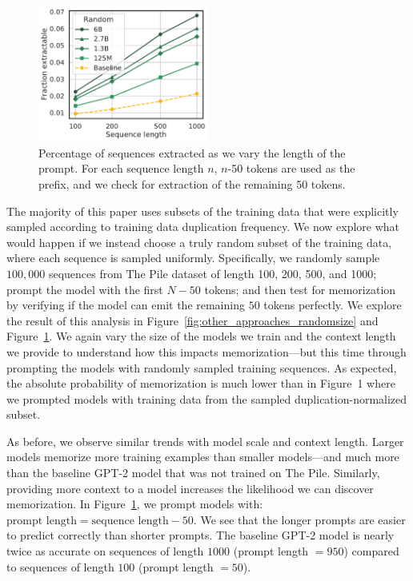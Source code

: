 \begin{figure}[h]
    \centering
    \includegraphics[width=0.5\textwidth]{figures/random_exactly_mem-vs-prompt_len-seq-varyseqlen-gen-50-xlabel-ylabel-markers} %
    \caption{Percentage of sequences extracted as we vary the length of the prompt. For each sequence length $n$, $n$-50 tokens are used as the prefix, and we check for extraction of the remaining 50 tokens.}
    \label{fig:other_approaches_randomlength}
\end{figure}


The majority of this paper uses subsets of the training data that were explicitly sampled according to training data duplication frequency.
%
We now explore what would happen if we instead choose a
truly random subset of the training data, where each sequence is sampled uniformly.
%
Specifically, we randomly sample $100,000$ sequences
from The Pile dataset of length 100, 200, 500, and 1000;
prompt the model with the first $N-50$ tokens; and then
test for memorization by verifying if the model can emit the remaining $50$ tokens perfectly.    
%
We explore the result of this analysis in
Figure~\ref{fig:other_approaches_randomsize} and Figure~\ref{fig:other_approaches_randomlength}.
We again vary the size of the models we train and the
context length we provide to understand how this impacts memorization---but this time through prompting the models
with randomly sampled training sequences.
%
As expected, the absolute probability of memorization is much lower than in Figure~1 where we prompted models with training data from the sampled duplication-normalized subset.

As before, we observe similar trends with model scale and context length.
Larger models memorize more training examples than smaller models---and much more than the baseline GPT-2 model
that was not trained on The Pile.
%
Similarly, providing more context to a model increases
the likelihood we can discover memorization.
%
In Figure~\ref{fig:other_approaches_randomlength}, we prompt models with: $\text{prompt length} = \text{sequence length} - 50$. We see that the longer prompts are easier to predict correctly than shorter prompts. 
The baseline GPT-2 model is nearly twice as accurate on
sequences of length $1000$ (prompt length $ = 950$) compared to sequences of length $100$ (prompt length $ = 50$).
%

